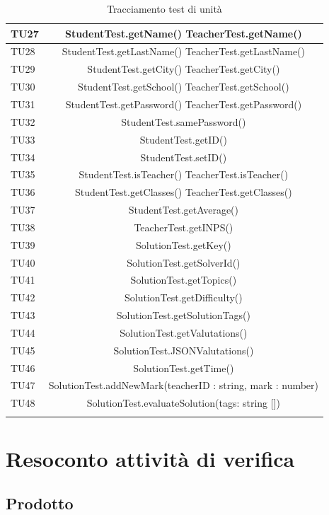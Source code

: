 \begin{longtable}{|>{\centering\arraybackslash}m{1.6cm}|c|}
		TU27 & StudentTest.getName() TeacherTest.getName()\\ \hline
		TU28 & StudentTest.getLastName() TeacherTest.getLastName()\\ \hline
		TU29 & StudentTest.getCity() TeacherTest.getCity()\\ \hline
		TU30 & StudentTest.getSchool() TeacherTest.getSchool()\\ \hline
		TU31 & StudentTest.getPassword() TeacherTest.getPassword()\\ \hline
		TU32 & StudentTest.samePassword()\\ \hline
		TU33 & StudentTest.getID()\\ \hline
		TU34 & StudentTest.setID()\\ \hline
		TU35 & StudentTest.isTeacher() TeacherTest.isTeacher()\\ \hline
		TU36 & StudentTest.getClasses() TeacherTest.getClasses()\\ \hline
		TU37 & StudentTest.getAverage()\\ \hline
		TU38 & TeacherTest.getINPS()\\ \hline
		TU39 & SolutionTest.getKey()\\ \hline
		TU40 & SolutionTest.getSolverId()\\ \hline
		TU41 & SolutionTest.getTopics()\\ \hline
		TU42 & SolutionTest.getDifficulty()\\ \hline
		TU43 & SolutionTest.getSolutionTags()\\ \hline
		TU44 & SolutionTest.getValutations()\\ \hline
		TU45 & SolutionTest.JSONValutations()\\ \hline
		TU46 & SolutionTest.getTime()\\ \hline
		TU47 & SolutionTest.addNewMark(teacherID : string, mark : number)\\ \hline
		TU48 & SolutionTest.evaluateSolution(tags: string [])\\ \hline
		\caption{Tracciamento test di unità}
\end{longtable}

	
\newpage
\section{Resoconto attività di verifica}
\subsection{Prodotto}

